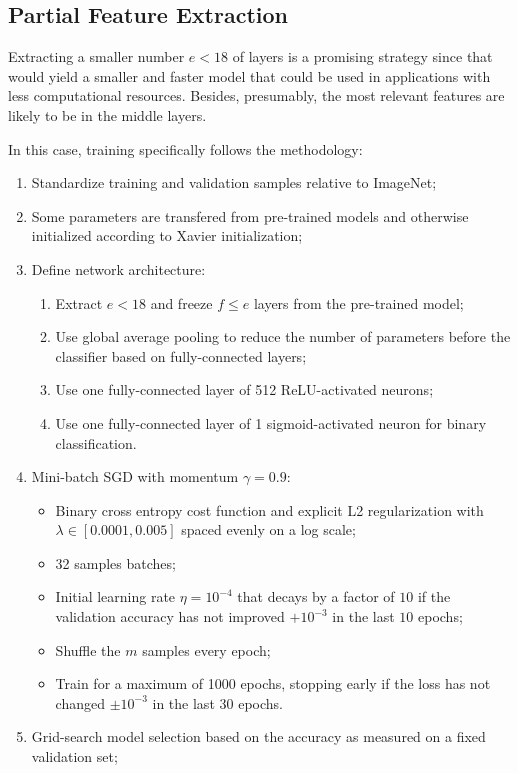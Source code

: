\subsection{Partial Feature Extraction}

Extracting a smaller number $e < 18$ of layers is a promising strategy since that would yield a smaller and faster model that could be used in applications with less computational resources. Besides, presumably, the most relevant features are likely to be in the middle layers.

In this case, training specifically follows the methodology:

\begin{enumerate}
    \item Standardize training and validation samples relative to ImageNet;
    \item Some parameters are transfered from pre-trained models and otherwise initialized according to Xavier initialization;
    \item Define network architecture:
        \begin{enumerate}
            \item Extract $e < 18$ and freeze $f \leq e$ layers from the pre-trained model;
            \item Use global average pooling to reduce the number of parameters before the classifier based on fully-connected layers;
            \item Use one fully-connected layer of 512 ReLU-activated neurons;
            \item Use one fully-connected layer of 1 sigmoid-activated neuron for binary classification.
        \end{enumerate}
    \item Mini-batch \ac{SGD} with momentum $\gamma = 0.9$:
        \begin{itemize}
            \item Binary cross entropy cost function and explicit L2 regularization with $\lambda \in [0.0001, 0.005]$ spaced evenly on a log scale;
            \item 32 samples batches;
            \item Initial learning rate $\eta = 10^{-4}$ that decays by a factor of $10$ if the validation accuracy has not improved $+10^{-3}$ in the last $10$ epochs;
            \item Shuffle the $m$ samples every epoch;
            \item Train for a maximum of 1000 epochs, stopping early if the loss has not changed $\pm 10^{-3}$ in the last $30$ epochs.
        \end{itemize}
    \item Grid-search model selection based on the accuracy as measured on a fixed validation set;
\end{enumerate}

